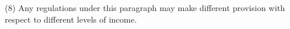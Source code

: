 \documentclass[12pt,a4paper]{article}
\begin{document}
(8) Any regulations under this paragraph may make different provision with respect to different levels of income.

%


%
%
%
%
%
%
%
\end{document}
